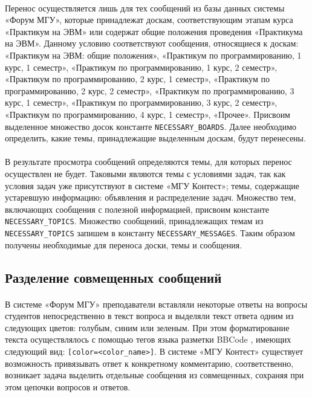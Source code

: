 \documentclass[12pt, a4paper, oneside]{article}
\begin{document}
\paragraph{}
Перенос осуществляется лишь для тех сообщений из базы данных системы «Форум МГУ», которые принадлежат доскам, соответствующим этапам курса «Практикум на ЭВМ» или содержат общие положения проведения «Практикума на ЭВМ». Данному условию соответствуют сообщения, относящиеся к доскам: «Практикум на ЭВМ: общие положения», «Практикум по программированию, 1 курс, 1 семестр», «Практикум по программированию, 1 курс, 2 семестр», «Практикум по программированию, 2 курс, 1 семестр», «Практикум по программированию, 2 курс, 2 семестр», «Практикум по программированию, 3 курс, 1 семестр», «Практикум по программированию, 3 курс, 2 семестр», «Практикум по программированию, 4 курс, 1 семестр», «Прочее». Присвоим выделенное множество досок константе \texttt{NECESSARY\_BOARDS}. Далее необходимо определить, какие темы, принадлежащие выделенным доскам, будут перенесены.
\paragraph{}
В результате просмотра сообщений определяются темы, для которых перенос осуществлен не будет. Таковыми являются темы с условиями задач, так как условия задач уже присутствуют в системе «МГУ Контест»; темы, содержащие устаревшую информацию: объявления и распределение задач. Множество тем, включающих сообщения с полезной информацией, присвоим константе \texttt{NECESSARY\_TOPICS}. Множество сообщений, принадлежащих темам из \texttt{NECESSARY\_TOPICS} запишем в константу \texttt{NECESSARY\_MESSAGES}. Таким образом получены необходимые для переноса доски, темы и сообщения.
\vspace{1cm}

\subsection{Разделение совмещенных сообщений}
\paragraph{}
В системе «Форум МГУ» преподаватели вставляли некоторые ответы на вопросы студентов непосредственно в текст вопроса и выделяли текст ответа одним из следующих цветов: голубым, синим или зеленым. При этом форматирование текста осуществлялось с помощью тегов языка разметки BBCode \cite{bbcode}, имеющих следующий вид: \texttt{[color=<color\_name>]}. В системе «МГУ Контест» существует возможность привязывать ответ к конкретному комментарию, соответственно, возникает задача выделить отдельные сообщения из совмещенных, сохраняя при этом цепочки вопросов и ответов.
\end{document}
